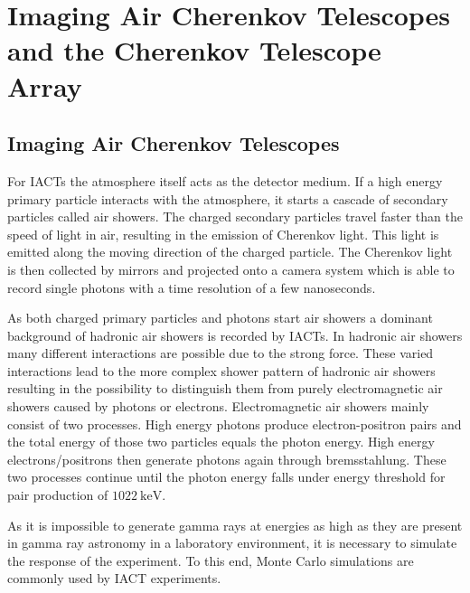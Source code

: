 \chapter{Imaging Air Cherenkov Telescopes and the Cherenkov Telescope Array}
\label{ch:cta}

\section{Imaging Air Cherenkov Telescopes}
For IACTs the atmosphere itself acts as the detector medium. 
If a high energy primary particle interacts with the atmosphere, it starts a cascade of secondary particles called air showers.
The charged secondary particles travel faster than the speed of light in air, resulting in the emission of Cherenkov light.
This light is emitted along the moving direction of the charged particle.
The Cherenkov light is then collected by mirrors and projected onto a camera system which is able to record single photons with a time resolution of a few nanoseconds.

As both charged primary particles and photons start air showers a dominant background of hadronic air showers is recorded by IACTs.
In hadronic air showers many different interactions are possible due to the strong force.
These varied interactions lead to the more complex shower pattern of hadronic air showers resulting in the possibility to distinguish them from purely electromagnetic
air showers caused by photons or electrons.
Electromagnetic air showers mainly consist of two processes. 
High energy photons produce electron-positron pairs and the total energy of those two particles equals the photon energy. 
High energy electrons/positrons then generate photons again through bremsstahlung. 
These two processes continue until the photon energy falls under energy threshold for pair production of $\SI{1022}{\kilo\electronvolt}$.

As it is impossible to generate gamma rays at energies as high as they are present in gamma ray astronomy in a laboratory environment, it is 
necessary to simulate the response of the experiment.
To this end, Monte Carlo simulations are commonly used by IACT experiments.


